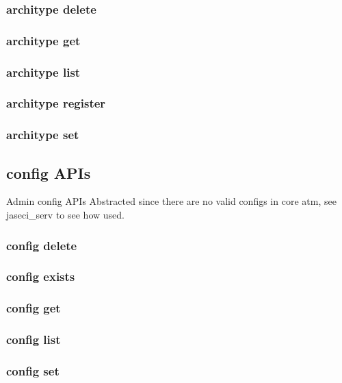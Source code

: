 \subsubsection{architype delete}

\subsubsection{architype get}

\subsubsection{architype list}

\subsubsection{architype register}

\subsubsection{architype set}

\subsection{config APIs}

Admin config APIs
Abstracted since there are no valid configs in core atm, see jaseci\_serv
to see how used.

\subsubsection{config delete}

\subsubsection{config exists}

\subsubsection{config get}

\subsubsection{config list}

\subsubsection{config set}

